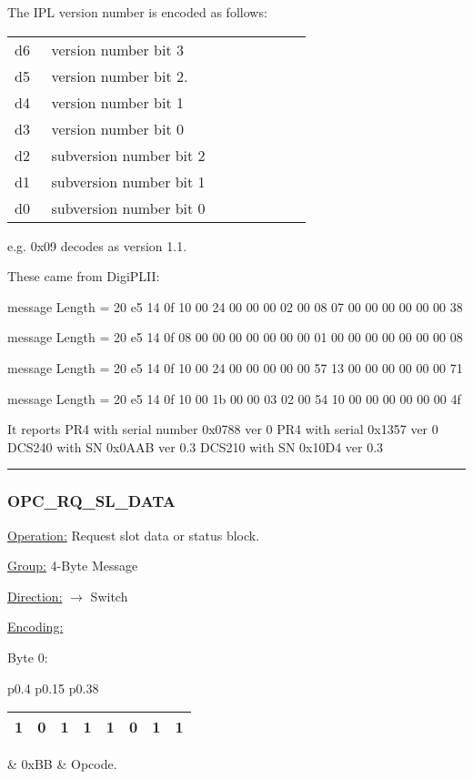 The IPL version number is encoded as follows:

\begin{tabular}{p{0.05\linewidth} p{0.6\linewidth}} 
d6 & version number bit 3\\
d5 & version number bit 2.\\
d4 & version number bit 1\\
d3 & version number bit 0\\
d2 & subversion number bit 2\\
d1 & subversion number bit 1\\
d0 & subversion number bit 0\\
\end{tabular}

e.g. 0x09 decodes as version 1.1.

These came from DigiPLII:

message Length = 20
e5 14 0f 10 00 24 00 00 00 02 00 08 07 00 00 00 00 00 00 38 

message Length = 20
e5 14 0f 08 00 00 00 00 00 00 00 01 00 00 00 00 00 00 00 08 

message Length = 20
e5 14 0f 10 00 24 00 00 00 00 00 57 13 00 00 00 00 00 00 71 

message Length = 20
e5 14 0f 10 00 1b 00 00 03 02 00 54 10 00 00 00 00 00 00 4f 

It reports PR4 with serial number 0x0788 ver 0
PR4 with serial 0x1357 ver 0
DCS240 with SN 0x0AAB ver 0.3
DCS210 with SN 0x10D4 ver 0.3


\rule{15.1cm}{0.4pt}
\subsubsection{OPC\_RQ\_SL\_DATA}
\underline{Operation:} Request slot data or status block.

\underline{Group:} \hspace{0.5cm} 4-Byte Message

\underline{Direction:} \hspace{0.05cm} $\rightarrow$ Switch

\underline{Encoding:} 

Byte 0:

\begin{tabular}{p{0.4\linewidth} p{0.15\linewidth} p{0.38\linewidth}} 

\begin{tabular}{|p{0.3cm}|p{0.3cm}|p{0.3cm}|p{0.3cm}|p{0.3cm}|p{0.3cm}|p{0.3cm}|p{0.3cm}|}
\hline
1 & 0 & 1 & 1 & 1 & 0 & 1 & 1\\
\hline
\end{tabular}
& 0xBB & Opcode.\\
\end{tabular}

